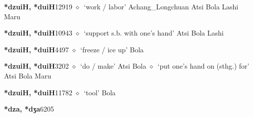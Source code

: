   \begin{list}{}{\leftmargin=1.5em \itemindent=-1.5em}
  \item {\footnotesize \textbf{*dzuiH, *duiH}}{\tiny 12919}
         $\diamond$~`work / labor'
         Achang\_Longchuan 
\hspace{1ex}
         Atsi 
\hspace{1ex}
         Bola 
\hspace{1ex}
         Lashi 
\hspace{1ex}
         Maru 
  \item {\footnotesize \textbf{*dzuiH, *duiH}}{\tiny 10943}
\hspace{1ex}
         $\diamond$~`support s.b. with one's hand'
         Atsi 
\hspace{1ex}
         Bola 
\hspace{1ex}
         Lashi 
  \item {\footnotesize \textbf{*dzuiH, *duiH}}{\tiny 4497}
\hspace{1ex}
         $\diamond$~`freeze / ice up'
         Bola 
  \item {\footnotesize \textbf{*dzuiH, *duiH}}{\tiny 3202}
\hspace{1ex}
         $\diamond$~`do / make'
         Atsi 
\hspace{1ex}
         Bola 
\hspace{1ex}
         $\diamond$~`put one's hand on (sthg.) for'
         Atsi 
\hspace{1ex}
         Bola 
\hspace{1ex}
         Maru 
  \item {\footnotesize \textbf{*dzuiH, *duiH}}{\tiny 11782}
\hspace{1ex}
         $\diamond$~`tool'
         Bola 
  \item {\footnotesize \textbf{*dza, *dʒa}}{\tiny 6205}
\hspace{1ex}

\end{list}
